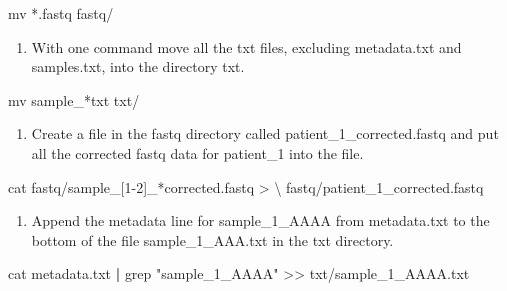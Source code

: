 \documentclass[
  letterpaper,
  DIV=11,
  numbers=noendperiod]{scrreprt}
\newenvironment{Shaded}{\begin{snugshade}}{\end{snugshade}}
\newcommand{\DataTypeTok}[1]{\textcolor[rgb]{0.68,0.00,0.00}{#1}}
\newcommand{\FunctionTok}[1]{\textcolor[rgb]{0.28,0.35,0.67}{#1}}
\newcommand{\KeywordTok}[1]{\textcolor[rgb]{0.00,0.23,0.31}{\textbf{#1}}}
\newcommand{\NormalTok}[1]{\textcolor[rgb]{0.00,0.23,0.31}{#1}}
\newcommand{\OperatorTok}[1]{\textcolor[rgb]{0.37,0.37,0.37}{#1}}
\newcommand{\PreprocessorTok}[1]{\textcolor[rgb]{0.68,0.00,0.00}{#1}}
\newcommand{\SpecialStringTok}[1]{\textcolor[rgb]{0.13,0.47,0.30}{#1}}
\newcommand{\StringTok}[1]{\textcolor[rgb]{0.13,0.47,0.30}{#1}}
\providecommand{\tightlist}{%
  \setlength{\itemsep}{0pt}\setlength{\parskip}{0pt}}
\begin{document}
\begin{Shaded}
\begin{Highlighting}[]
\FunctionTok{mv} \PreprocessorTok{*}\NormalTok{.fastq fastq/}
\end{Highlighting}
\end{Shaded}

\begin{enumerate}
\def\labelenumi{\arabic{enumi}.}
\setcounter{enumi}{4}
\tightlist
\item
  With one command move all the txt files, excluding metadata.txt and
  samples.txt, into the directory txt.
\end{enumerate}

\begin{Shaded}
\begin{Highlighting}[]
\FunctionTok{mv}\NormalTok{ sample\_}\PreprocessorTok{*}\NormalTok{txt txt/}
\end{Highlighting}
\end{Shaded}

\begin{enumerate}
\def\labelenumi{\arabic{enumi}.}
\setcounter{enumi}{5}
\tightlist
\item
  Create a file in the fastq directory called
  patient\_1\_corrected.fastq and put all the corrected fastq data for
  patient\_1 into the file.
\end{enumerate}

\begin{Shaded}
\begin{Highlighting}[]
\FunctionTok{cat}\NormalTok{ fastq/sample\_}\PreprocessorTok{[}\SpecialStringTok{1}\PreprocessorTok{{-}}\SpecialStringTok{2}\PreprocessorTok{]}\NormalTok{\_}\PreprocessorTok{*}\NormalTok{corrected.fastq }\OperatorTok{\textgreater{}} \DataTypeTok{\textbackslash{}}
\NormalTok{fastq/patient\_1\_corrected.fastq}
\end{Highlighting}
\end{Shaded}

\begin{enumerate}
\def\labelenumi{\arabic{enumi}.}
\setcounter{enumi}{6}
\tightlist
\item
  Append the metadata line for sample\_1\_AAAA from metadata.txt to the
  bottom of the file sample\_1\_AAA.txt in the txt directory.
\end{enumerate}

\begin{Shaded}
\begin{Highlighting}[]
\FunctionTok{cat}\NormalTok{ metadata.txt }\KeywordTok{|} \FunctionTok{grep} \StringTok{"sample\_1\_AAAA"} \OperatorTok{\textgreater{}\textgreater{}}\NormalTok{ txt/sample\_1\_AAAA.txt}
\end{Highlighting}
\end{Shaded}
\end{document}
